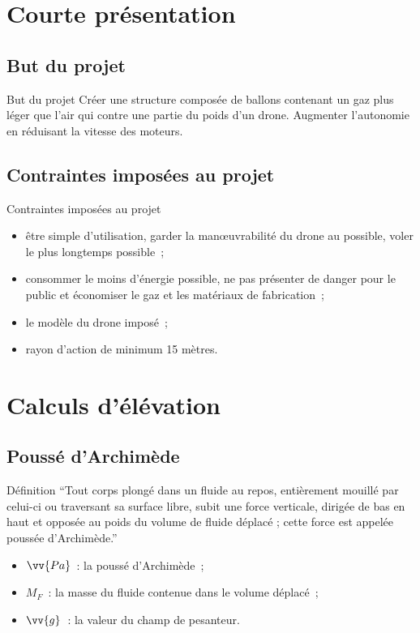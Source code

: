 

\section{Courte présentation}

\subsection{But du projet}
\begin{frame}{But du projet}
 Créer une structure composée de ballons contenant un gaz plus léger que l’air qui contre une partie du poids d'un drone.
 Augmenter l’autonomie en réduisant la vitesse des moteurs.
\end{frame}

\subsection{Contraintes imposées au projet}
\begin{frame}{Contraintes imposées au projet}
  \begin{itemize}
    \item être simple d’utilisation, garder la manœuvrabilité du drone au possible, voler le plus longtemps possible~;
    \item consommer le moins d’énergie possible, ne pas présenter de danger pour le public et économiser le gaz et les matériaux de fabrication~;
    \item le modèle du drone imposé~;
    \item rayon d’action de minimum 15 mètres.
  \end{itemize}
\end{frame}

\section{Calculs d'élévation}

\subsection{Poussé d'Archimède}

\begin{frame}{Définition}
  \enquote{Tout corps plongé dans un fluide au repos, entièrement mouillé par celui-ci ou traversant sa surface libre, subit une force verticale, dirigée de bas en haut et opposée au poids du volume de fluide déplacé ; cette force est appelée poussée d'Archimède.}
  \bigbreak
  \begin{center}
  \end{center}
  \begin{itemize}
    \item $\vv{Pa}$~: la poussé d'Archimède~;
    \item $M_F$~: la masse du fluide contenue dans le volume déplacé~;
    \item $\vv{g}$~: la valeur du champ de pesanteur.
  \end{itemize}
\end{frame}

